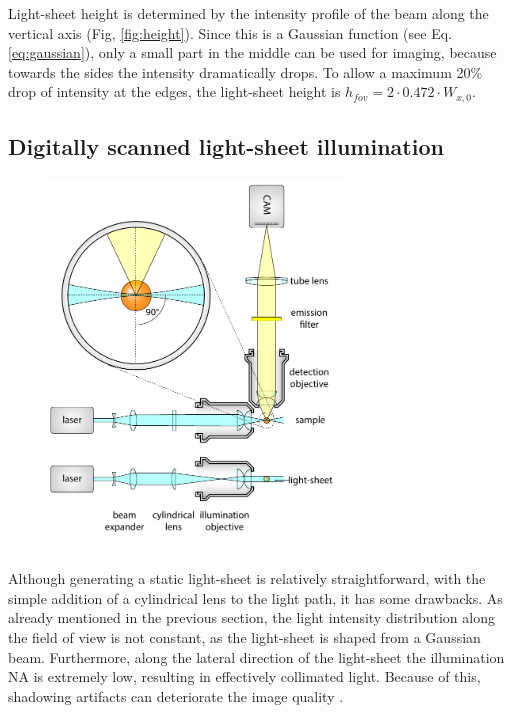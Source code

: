     Light-sheet height is determined by the intensity profile of the beam along the vertical axis (Fig, \ref{fig:height}). Since this is a Gaussian function (see Eq. \ref{eq:gaussian}), only a small part in the middle can be used for imaging, because towards the sides the intensity dramatically drops. To allow a maximum 20\% drop of intensity at the edges, the light-sheet height is $h_{fov}=2\cdot 0.472\cdot W_{x,0}$.
    

  \subsection{Digitally scanned light-sheet illumination}

    \begin{figure}[bt!]
      \centering
      \includegraphics[page=2,width=0.7\textwidth]{spim_cyl}
        \label{fig:dslm}
    \end{figure}

    Although generating a static light-sheet is relatively straightforward, with the simple addition of a cylindrical lens to the light path, it has some drawbacks. As already mentioned in the previous section, the light intensity distribution along the field of view is not constant, as the light-sheet is shaped from a Gaussian beam. Furthermore, along the lateral direction of the light-sheet the illumination NA is extremely low, resulting in effectively collimated light. Because of this, shadowing artifacts can deteriorate the image quality \cite{huisken_even_2007}.


